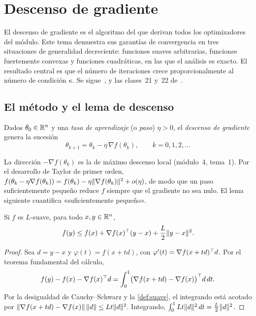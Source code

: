 \chapter{Descenso de gradiente}
\label{tema:2}

El descenso de gradiente es el algoritmo del que derivan todos los optimizadores del módulo. Este tema demuestra sus garantías de convergencia en tres situaciones de generalidad decreciente: funciones suaves arbitrarias, funciones fuertemente convexas y funciones cuadráticas, en las que el análisis es exacto. El resultado central es que el número de iteraciones crece proporcionalmente al número de condición $\kappa$. Se sigue~\cite[§9.2 y §9.3]{bv}, \cite[§12.3]{d2l} y las clases~21 y~22 de~\cite{mit18065}.

\section{El método y el lema de descenso}

\begin{definicion}\label{def:gd}
Dados $\theta_0\in\mathbb{R}^{n}$ y una \emph{tasa de aprendizaje} (o \emph{paso}) $\eta>0$, el \emph{descenso de gradiente} genera la sucesión
\[
\theta_{k+1}=\theta_k-\eta\,\nabla f(\theta_k),\qquad k=0,1,2,\dots
\]
\end{definicion}

La dirección $-\nabla f(\theta_k)$ es la de máximo descenso local (módulo~4, tema~1). Por el desarrollo de Taylor de primer orden, $f(\theta_k-\eta\nabla f(\theta_k))=f(\theta_k)-\eta\lVert\nabla f(\theta_k)\rVert^{2}+o(\eta)$, de modo que un paso suficientemente pequeño reduce $f$ siempre que el gradiente no sea nulo. El lema siguiente cuantifica «suficientemente pequeño».

\begin{lema}\label{lem:descenso}
Si $f$ es $L$-suave, para todo $x,y\in\mathbb{R}^{n}$,
\[
f(y)\le f(x)+\nabla f(x)^{\top}(y-x)+\frac{L}{2}\lVert y-x\rVert^{2}.
\]
\end{lema}

\begin{proof}
Sea $d=y-x$ y $\varphi(t)=f(x+td)$, con $\varphi'(t)=\nabla f(x+td)^{\top} d$. Por el teorema fundamental del cálculo,
\[
f(y)-f(x)-\nabla f(x)^{\top} d=\int_0^1\bigl(\nabla f(x+td)-\nabla f(x)\bigr)^{\top} d\,dt.
\]
Por la desigualdad de Cauchy--Schwarz y la \cref{def:suave}, el integrando está acotado por $\lVert\nabla f(x+td)-\nabla f(x)\rVert\,\lVert d\rVert\le Lt\lVert d\rVert^{2}$. Integrando, $\int_0^1 Lt\lVert d\rVert^{2}\,dt=\frac{L}{2}\lVert d\rVert^{2}$.
\end{proof}

